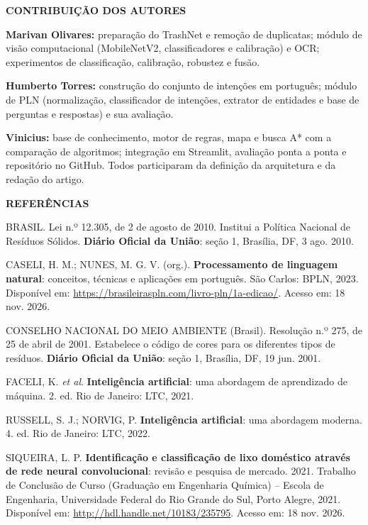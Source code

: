 \documentclass[12pt,a4paper]{article}
\newcommand{\secaosemnumero}[1]{\begin{center}\textbf{\MakeUppercase{#1}}\end{center}}
\begin{document}
\vspace{12pt}
\secaosemnumero{Contribuição dos autores}
\textbf{Marivan Olivares:} preparação do TrashNet e remoção de duplicatas; módulo de visão computacional (MobileNetV2, classificadores e calibração) e OCR; experimentos de classificação, calibração, robustez e fusão.

\textbf{Humberto Torres:} construção do conjunto de intenções em português; módulo de PLN (normalização, classificador de intenções, extrator de entidades e base de perguntas e respostas) e sua avaliação.

\textbf{Vinicius:} base de conhecimento, motor de regras, mapa e busca A* com a comparação de algoritmos; integração em Streamlit, avaliação ponta a ponta e repositório no GitHub. Todos participaram da definição da arquitetura e da redação do artigo.

\vspace{12pt}
\secaosemnumero{Referências}
\begin{singlespace}
\setlength{\parindent}{0pt}
\setlength{\parskip}{12pt}
\raggedright

BRASIL. Lei n.º 12.305, de 2 de agosto de 2010. Institui a Política Nacional de Resíduos Sólidos. \textbf{Diário Oficial da União}: seção 1, Brasília, DF, 3 ago. 2010.

CASELI, H. M.; NUNES, M. G. V. (org.). \textbf{Processamento de linguagem natural}: conceitos, técnicas e aplicações em português. São Carlos: BPLN, 2023. Disponível em: \url{https://brasileiraspln.com/livro-pln/1a-edicao/}. Acesso em: 18 nov. 2026.

CONSELHO NACIONAL DO MEIO AMBIENTE (Brasil). Resolução n.º 275, de 25 de abril de 2001. Estabelece o código de cores para os diferentes tipos de resíduos. \textbf{Diário Oficial da União}: seção 1, Brasília, DF, 19 jun. 2001.

FACELI, K. \textit{et al}. \textbf{Inteligência artificial}: uma abordagem de aprendizado de máquina. 2. ed. Rio de Janeiro: LTC, 2021.

RUSSELL, S. J.; NORVIG, P. \textbf{Inteligência artificial}: uma abordagem moderna. 4. ed. Rio de Janeiro: LTC, 2022.

SIQUEIRA, L. P. \textbf{Identificação e classificação de lixo doméstico através de rede neural convolucional}: revisão e pesquisa de mercado. 2021. Trabalho de Conclusão de Curso (Graduação em Engenharia Química) – Escola de Engenharia, Universidade Federal do Rio Grande do Sul, Porto Alegre, 2021. Disponível em: \url{http://hdl.handle.net/10183/235795}. Acesso em: 18 nov. 2026.
\end{singlespace}
\end{document}
